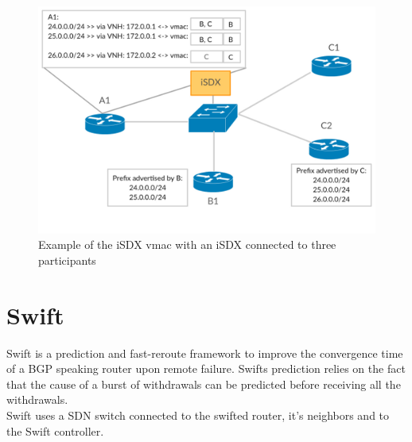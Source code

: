 \begin{figure}[h]
\includegraphics[scale = 0.36]{Figures/intro_sdx_vmac.pdf}
\caption{Example of the iSDX vmac with an iSDX connected to three participants}
\label{fig:isdx_vmac}
\end{figure}

\section{\label{chapter2:Swift}Swift}


Swift is a prediction and fast-reroute framework to improve the convergence time of a BGP speaking router upon remote failure. Swifts prediction relies on the fact that the cause of a burst of withdrawals can be predicted before receiving all the withdrawals. \\ Swift uses a SDN switch connected to the swifted router, it's neighbors and to the Swift controller. 


